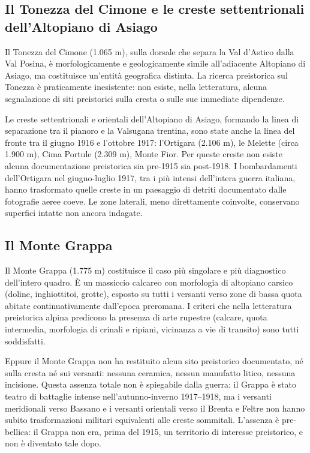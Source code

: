 \subsection{Il Tonezza del Cimone e le creste settentrionali dell'Altopiano di Asiago}

Il Tonezza del Cimone (1.065 m), sulla dorsale che separa la Val d'Astico dalla Val Posina, è morfologicamente e geologicamente simile all'adiacente Altopiano di Asiago, ma costituisce un'entità geografica distinta. La ricerca preistorica sul Tonezza è praticamente inesistente: non esiste, nella letteratura, alcuna segnalazione di siti preistorici sulla cresta o sulle sue immediate dipendenze.

Le creste settentrionali e orientali dell'Altopiano di Asiago, formando la linea di separazione tra il pianoro e la Valsugana trentina, sono state anche la linea del fronte tra il giugno 1916 e l'ottobre 1917: l'Ortigara (2.106 m), le Melette (circa 1.900 m), Cima Portule (2.309 m), Monte Fior. Per queste creste non esiste alcuna documentazione preistorica sia pre-1915 sia post-1918. I bombardamenti dell'Ortigara nel giugno-luglio 1917, tra i più intensi dell'intera guerra italiana, hanno trasformato quelle creste in un paesaggio di detriti documentato dalle fotografie aeree coeve. Le zone laterali, meno direttamente coinvolte, conservano superfici intatte non ancora indagate.

\subsection{Il Monte Grappa}

Il Monte Grappa (1.775 m) costituisce il caso più singolare e più diagnostico dell'intero quadro. È un massiccio calcareo con morfologia di altopiano carsico (doline, inghiottitoi, grotte), esposto su tutti i versanti verso zone di bassa quota abitate continuativamente dall'epoca preromana. I criteri che nella letteratura preistorica alpina predicono la presenza di arte rupestre (calcare, quota intermedia, morfologia di crinali e ripiani, vicinanza a vie di transito) sono tutti soddisfatti.

Eppure il Monte Grappa non ha restituito alcun sito preistorico documentato, né sulla cresta né sui versanti: nessuna ceramica, nessun manufatto litico, nessuna incisione. Questa assenza totale non è spiegabile dalla guerra: il Grappa è stato teatro di battaglie intense nell'autunno-inverno 1917--1918, ma i versanti meridionali verso Bassano e i versanti orientali verso il Brenta e Feltre non hanno subito trasformazioni militari equivalenti alle creste sommitali. L'assenza è pre-bellica: il Grappa non era, prima del 1915, un territorio di interesse preistorico, e non è diventato tale dopo.

